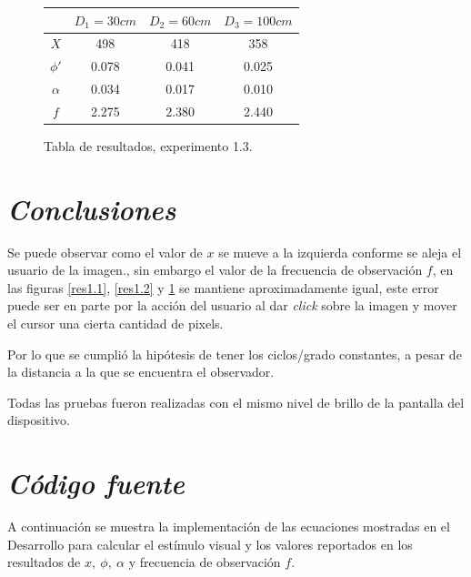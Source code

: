 \documentclass[conference]{IEEEtran}
\begin{document}
\begin{figure}[htbp]
\centering

\begin{tabular}{c|c|c|c|}
	 & $D_1=30cm$ & $D_2=60cm$ & $D_3=100 cm$\\
	\hline
	$X$ & 498 & 418 & 358\\
	\hline
	$\phi'$ & 0.078 & 0.041 & 0.025\\
	\hline
	$\alpha$ & 0.034 & 0.017 & 0.010\\
	\hline
	$f$ & 2.275 & 2.380 & 2.440\\
	\hline

\end{tabular}

\caption{Tabla de resultados, experimento 1.3.}
\label{res1.3}
\end{figure}



\section{\textit{Conclusiones}}

Se puede observar como el valor de $x$ se mueve a la izquierda conforme se aleja el usuario de la imagen., sin embargo el valor de la frecuencia de observación $f$, en las figuras \ref{res1.1}, \ref{res1.2} y \ref{res1.3} se mantiene aproximadamente igual, este error puede ser en parte por la acción del usuario al dar \textit{click} sobre la imagen y mover el cursor una cierta cantidad de pixels.

Por lo que se cumplió la hipótesis de tener los ciclos/grado constantes, a pesar de la distancia a la que se encuentra el observador.

Todas las pruebas fueron realizadas con el mismo nivel de brillo de la pantalla del dispositivo.

\section{\textit{Código fuente}}

A continuación se muestra la implementación de las ecuaciones mostradas en el Desarrollo para calcular el estímulo visual y los valores reportados en los resultados de $x,\ \phi,\ \alpha$ y frecuencia de observación $f$.
\end{document}

